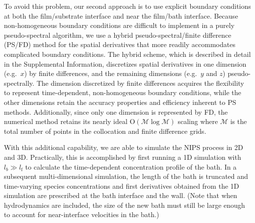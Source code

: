 \documentclass[journal=mamobx, layout=twocolumn]{achemso}
\newcommand{\txtf}{\mathrm{f}}
\begin{document}
To avoid this problem, our second approach is to use explicit boundary conditions at both the film/substrate interface and near the film/bath interface.
Because non-homogeneous boundary conditions are difficult to implement in a purely pseudo-spectral algorithm, we use a hybrid pseudo-spectral/finite difference (PS/FD) method for the spatial derivatives that more readily accommodates complicated boundary conditions.
The hybrid scheme, which is described in detail in the Supplemental Information, discretizes spatial derivatives in one dimension (e.g.~$x$) by finite differences, and the remaining dimensions (e.g.\ $y$ and $z$) pseudo-spectrally.
The dimension discretized by finite differences acquires the flexibility to represent time-dependent, non-homogeneous boundary conditions, while the other dimensions retain the accuracy properties and efficiency inherent to PS methods.
Additionally, since only one dimension is represented by FD, the numerical method retains its nearly ideal O$(\mathcal{M} \log \mathcal{M})$ scaling where $\mathcal{M}$ is the total number of points in the collocation and finite difference grids.

With this additional capability, we are able to simulate the NIPS process in 2D and 3D.
Practically, this is accomplished by first running a 1D simulation with $l_{b} \gg l_{\txtf}$ to calculate the time-dependent concentration profile of the bath.
In a subsequent multi-dimensional simulation, the length of the bath is truncated and time-varying species concentrations and first derivatives obtained from the 1D simulation are prescribed at the bath interface and the wall.
(Note that when hydrodynamics are included, the size of the new bath must still be large enough to account for near-interface velocities in the bath.)
\end{document}
